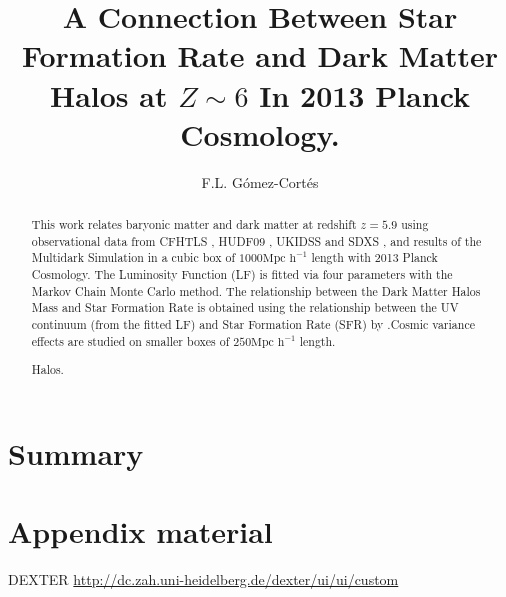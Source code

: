 \documentclass[manuscript]{aastex}
\begin{document}
\title{A Connection Between Star Formation Rate and Dark Matter Halos at 
$Z\sim6$ In 2013 Planck Cosmology.}

\author{F.L. G\'omez-Cort\'es }

\begin{abstract}
This work relates baryonic matter and dark matter at redshift $z=5.9$ using 
observational data from CFHTLS \citep{willott13}, HUDF09 
\citep{bouwens06,bouwens12}, UKIDSS and SDXS \citep{mclure09}, and results of 
the Multidark Simulation \citep{riebe13} in a cubic box of $1000 \textrm{Mpc 
h}^{-1}$ length with 2013 Planck Cosmology. The Luminosity Function (LF) is 
fitted via four parameters with the Markov Chain Monte Carlo method. The 
relationship between the Dark Matter Halos Mass and Star Formation Rate is 
obtained using the relationship between the UV  continuum (from the fitted LF) 
and Star Formation Rate (SFR) by \cite{kennicutt98}.Cosmic variance effects are 
studied on smaller boxes of $250 \textrm{Mpc h}^{-1}$ length.

Halos.
\end{abstract}












\section{Summary}


\acknowledgments
%
\appendix

\section{Appendix material}
DEXTER \url{http://dc.zah.uni-heidelberg.de/dexter/ui/ui/custom}


\end{document}
